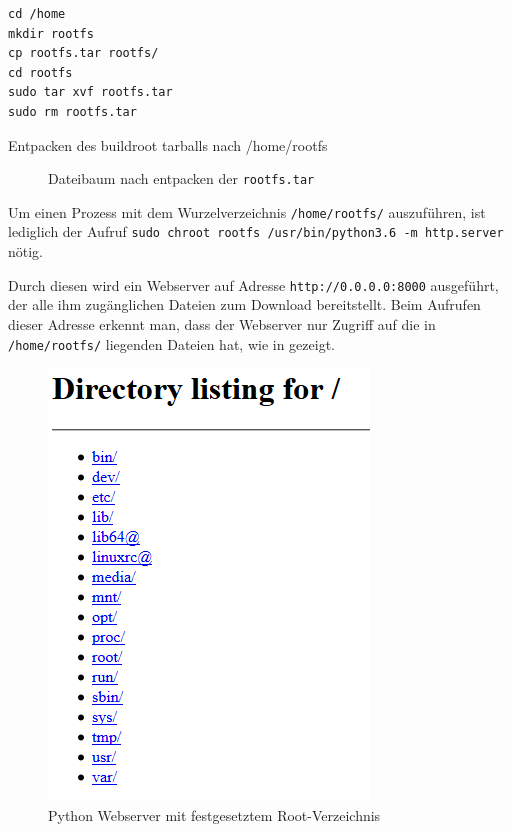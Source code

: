 \begin{listing}[h]
	\begin{verbatim}
cd /home
mkdir rootfs
cp rootfs.tar rootfs/
cd rootfs
sudo tar xvf rootfs.tar
sudo rm rootfs.tar
	\end{verbatim}
	\caption{Entpacken des buildroot tarballs nach /home/rootfs}
	\label{lst:untarRootfs}
\end{listing}


\begin{figure}[h]
	\centering
	\begin{minipage}{0.9\textwidth}
	\end{minipage}
	\caption{Dateibaum nach entpacken der \texttt{rootfs.tar}}
	\label{fig:baumNachUntar}
\end{figure}

Um einen Prozess mit dem Wurzelverzeichnis \texttt{/home/rootfs/} auszuführen, ist lediglich der Aufruf \texttt{sudo chroot rootfs /usr/bin/python3.6 -m http.server} nötig.

Durch diesen wird ein Webserver auf Adresse \texttt{http://0.0.0.0:8000} ausgeführt, der alle ihm zugänglichen Dateien zum Download bereitstellt. Beim Aufrufen dieser Adresse erkennt man, dass der Webserver nur Zugriff auf die in \texttt{/home/rootfs/} liegenden Dateien hat, wie in  gezeigt.

\begin{figure}[H]
	\begin{center}
		\includegraphics[scale=0.7]{bilder/chroot-python-webserver.png}
		\caption{Python Webserver mit festgesetztem Root-Verzeichnis}
		\label{fig:chrootPythonWebserver}
	\end{center}
\end{figure}

